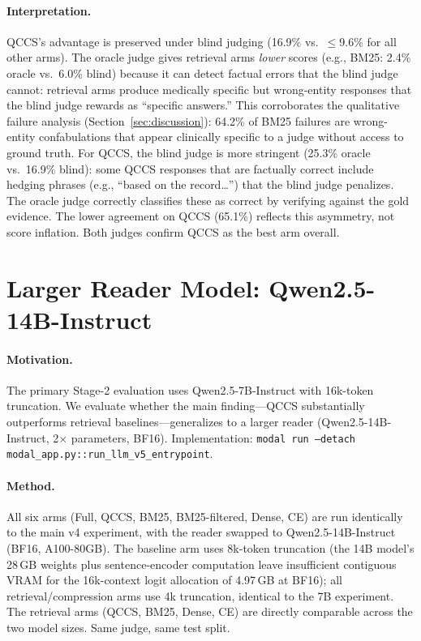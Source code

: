 \documentclass{article}
\begin{document}
\paragraph{Interpretation.}
QCCS's advantage is preserved under blind judging (16.9\% vs.\ $\leq$9.6\% for
all other arms). The oracle judge gives retrieval arms \emph{lower} scores (e.g.,
BM25: 2.4\% oracle vs.\ 6.0\% blind) because it can detect factual errors that
the blind judge cannot: retrieval arms produce medically specific but wrong-entity
responses that the blind judge rewards as ``specific answers.'' This corroborates
the qualitative failure analysis (Section~\ref{sec:discussion}): 64.2\% of BM25
failures are wrong-entity confabulations that appear clinically specific to a
judge without access to ground truth.
For QCCS, the blind judge is more stringent (25.3\% oracle vs.\ 16.9\% blind):
some QCCS responses that are factually correct include hedging phrases (e.g.,
``based on the record\ldots'') that the blind judge penalizes. The oracle judge
correctly classifies these as correct by verifying against the gold evidence.
The lower agreement on QCCS (65.1\%) reflects this asymmetry, not score inflation.
Both judges confirm QCCS as the best arm overall.



\section{Larger Reader Model: Qwen2.5-14B-Instruct}
\label{app:largerreader}

\paragraph{Motivation.}
The primary Stage-2 evaluation uses Qwen2.5-7B-Instruct with 16k-token truncation.
We evaluate whether the main finding---QCCS substantially outperforms retrieval
baselines---generalizes to a larger reader (Qwen2.5-14B-Instruct,
2$\times$ parameters, BF16). Implementation: \texttt{modal run --detach modal\_app.py::run\_llm\_v5\_entrypoint}.

\paragraph{Method.}
All six arms (Full, QCCS, BM25, BM25-filtered, Dense, CE) are run identically to
the main v4 experiment, with the reader swapped to Qwen2.5-14B-Instruct (BF16,
A100-80GB). The baseline arm uses 8k-token truncation (the 14B model's 28\,GB
weights plus sentence-encoder computation leave insufficient contiguous VRAM for
the 16k-context logit allocation of 4.97\,GB at BF16); all retrieval/compression
arms use 4k truncation, identical to the 7B experiment. The retrieval arms (QCCS,
BM25, Dense, CE) are directly comparable across the two model sizes. Same judge,
same test split.
\end{document}
